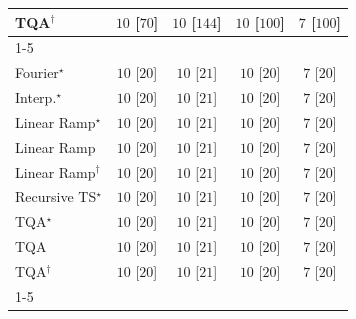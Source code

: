 \begin{tabular}{l|cccc|}
TQA$^\dagger$ & {\cellcolor[HTML]{00441B}} \color[HTML]{F1F1F1} $10$ [$70$] & {\cellcolor[HTML]{00441B}} \color[HTML]{F1F1F1} $10$ [$144$] & {\cellcolor[HTML]{00441B}} \color[HTML]{F1F1F1} $10$ [$100$] & {\cellcolor[HTML]{F7FCF5}} \color[HTML]{000000} $7$ [$100$] \\
\cline{1-5}
\multicolumn{5}{c}{\rule{0pt}{8pt}SV} \\
\midrule
Fourier$^\star$ & {\cellcolor[HTML]{00441B}} \color[HTML]{F1F1F1} $10$ [$20$] & {\cellcolor[HTML]{00441B}} \color[HTML]{F1F1F1} $10$ [$21$] & {\cellcolor[HTML]{00441B}} \color[HTML]{F1F1F1} $10$ [$20$] & {\cellcolor[HTML]{F7FCF5}} \color[HTML]{000000} $7$ [$20$] \\
Interp.$^\star$ & {\cellcolor[HTML]{00441B}} \color[HTML]{F1F1F1} $10$ [$20$] & {\cellcolor[HTML]{00441B}} \color[HTML]{F1F1F1} $10$ [$21$] & {\cellcolor[HTML]{00441B}} \color[HTML]{F1F1F1} $10$ [$20$] & {\cellcolor[HTML]{F7FCF5}} \color[HTML]{000000} $7$ [$20$] \\
Linear Ramp$^\star$ & {\cellcolor[HTML]{00441B}} \color[HTML]{F1F1F1} $10$ [$20$] & {\cellcolor[HTML]{00441B}} \color[HTML]{F1F1F1} $10$ [$21$] & {\cellcolor[HTML]{00441B}} \color[HTML]{F1F1F1} $10$ [$20$] & {\cellcolor[HTML]{F7FCF5}} \color[HTML]{000000} $7$ [$20$] \\
Linear Ramp & {\cellcolor[HTML]{00441B}} \color[HTML]{F1F1F1} $10$ [$20$] & {\cellcolor[HTML]{00441B}} \color[HTML]{F1F1F1} $10$ [$21$] & {\cellcolor[HTML]{00441B}} \color[HTML]{F1F1F1} $10$ [$20$] & {\cellcolor[HTML]{F7FCF5}} \color[HTML]{000000} $7$ [$20$] \\
Linear Ramp$^\dagger$ & {\cellcolor[HTML]{00441B}} \color[HTML]{F1F1F1} $10$ [$20$] & {\cellcolor[HTML]{00441B}} \color[HTML]{F1F1F1} $10$ [$21$] & {\cellcolor[HTML]{00441B}} \color[HTML]{F1F1F1} $10$ [$20$] & {\cellcolor[HTML]{F7FCF5}} \color[HTML]{000000} $7$ [$20$] \\
Recursive TS$^\star$ & {\cellcolor[HTML]{00441B}} \color[HTML]{F1F1F1} $10$ [$20$] & {\cellcolor[HTML]{00441B}} \color[HTML]{F1F1F1} $10$ [$21$] & {\cellcolor[HTML]{00441B}} \color[HTML]{F1F1F1} $10$ [$20$] & {\cellcolor[HTML]{F7FCF5}} \color[HTML]{000000} $7$ [$20$] \\
TQA$^\star$ & {\cellcolor[HTML]{00441B}} \color[HTML]{F1F1F1} $10$ [$20$] & {\cellcolor[HTML]{00441B}} \color[HTML]{F1F1F1} $10$ [$21$] & {\cellcolor[HTML]{00441B}} \color[HTML]{F1F1F1} $10$ [$20$] & {\cellcolor[HTML]{F7FCF5}} \color[HTML]{000000} $7$ [$20$] \\
TQA & {\cellcolor[HTML]{00441B}} \color[HTML]{F1F1F1} $10$ [$20$] & {\cellcolor[HTML]{00441B}} \color[HTML]{F1F1F1} $10$ [$21$] & {\cellcolor[HTML]{00441B}} \color[HTML]{F1F1F1} $10$ [$20$] & {\cellcolor[HTML]{F7FCF5}} \color[HTML]{000000} $7$ [$20$] \\
TQA$^\dagger$ & {\cellcolor[HTML]{00441B}} \color[HTML]{F1F1F1} $10$ [$20$] & {\cellcolor[HTML]{00441B}} \color[HTML]{F1F1F1} $10$ [$21$] & {\cellcolor[HTML]{00441B}} \color[HTML]{F1F1F1} $10$ [$20$] & {\cellcolor[HTML]{F7FCF5}} \color[HTML]{000000} $7$ [$20$] \\
\cline{1-5}
\bottomrule
\end{tabular}

